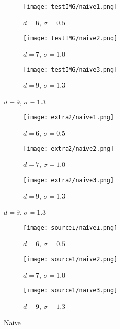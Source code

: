 \documentclass{article}
\begin{document}
\begin{figure}[h]
\begin{subfigure}{0.3\textwidth}
    \texttt{[image: testIMG/naive1.png]}
    \caption{$d=6$, $\sigma=0.5$}
    \label{fig:first}
\end{subfigure}%
    \hfill
\begin{subfigure}{0.3\textwidth}
    \texttt{[image: testIMG/naive2.png]}
    \caption{$d=7$, $\sigma=1.0$}
    \label{fig:second}
\end{subfigure}%
\hfill
\begin{subfigure}{0.3\textwidth}
    \texttt{[image: testIMG/naive3.png]}
    \caption{$d=9$, $\sigma=1.3$}
    \label{fig:third}
\end{subfigure}
\label{fig:figures}
\end{figure}
\begin{figure}[h]
\begin{subfigure}{0.3\textwidth}
    \texttt{[image: extra2/naive1.png]}
        \caption{$d=6$, $\sigma=0.5$}
    \label{fig:first}
\end{subfigure}%
    \hfill
\begin{subfigure}{0.3\textwidth}
    \texttt{[image: extra2/naive2.png]}
        \caption{$d=7$, $\sigma=1.0$}
    \label{fig:second}
\end{subfigure}%
\hfill
\begin{subfigure}{0.3\textwidth}
    \texttt{[image: extra2/naive3.png]}
        \caption{$d=9$, $\sigma=1.3$}
    \label{fig:third}
\end{subfigure}
\label{fig:figures}
\end{figure}
\begin{figure}[h]
\begin{subfigure}{0.25\textwidth}
    \texttt{[image: source1/naive1.png]}
    \caption{$d=6$, $\sigma=0.5$}
    \label{fig:first}
\end{subfigure}%
    \hfill
\begin{subfigure}{0.25\textwidth}
    \texttt{[image: source1/naive2.png]}
        \caption{$d=7$, $\sigma=1.0$}
    \label{fig:second}
\end{subfigure}%
\hfill
\begin{subfigure}{0.25\textwidth}
    \texttt{[image: source1/naive3.png]}
        \caption{$d=9$, $\sigma=1.3$}
    \label{fig:third}
\end{subfigure}
\caption{Naive}
\label{fig:figures}
\end{figure}
\end{document}
